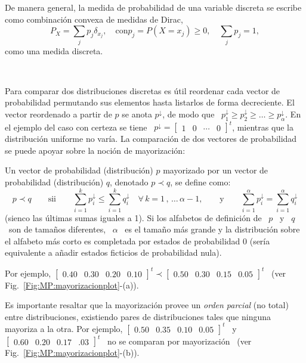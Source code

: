 De manera general, la medida de probabilidad de una variable discreta se escribe
como combinaci\'on convexa de medidas de Dirac,
%
\[
P_X =  \sum_j p_j  \delta_{x_j}, \quad  \mbox{con} p_j =  P(X=x_j) \ge  0, \quad
\sum_j p_j = 1,
\]
%
\noindent \ie como una medida discreta.

\

Para comparar  dos distribuciones discretas  es \'util reordenar cada  vector de
probabilidad permutando  sus elementos hasta listarlos de  forma decreciente. El
vector  reordenado a  partir  de $p$  se  anota $p^\downarrow$,  de  modo que  \
$p^\downarrow_1 \ge  p^\downarrow_2 \ge \ldots \ge  p^\downarrow_\alpha$.  En el
ejemplo del caso con certeza se tiene  \ $p^\downarrow = \begin{bmatrix} 1 & 0 &
  \cdots  &  0 \end{bmatrix}^t$,  mientras  que  la  distribuci\'on uniforme  no
var\'ia.  La comparaci\'on de dos vectores de probabilidad se puede apoyar sobre
la noci\'on de mayorizaci\'on:
%
\begin{definicion}[Mayorizaci\'on]
\label{Def:MP:Mayorizacion}
%
  Un vector  de probabilidad  (distribuci\'on) $p$ mayorizado  por un  vector de
  probabilidad (distribuci\'on) $q$, denotado $p \prec q$, se define como:
  \[
  p   \prec  q   \qquad  \mbox{sii}   \qquad  \sum_{i=1}^k   p_i^\downarrow  \le
  \sum_{i=1}^k q_i^\downarrow \quad \forall \, k = 1 \, , \, \ldots \, \alpha-1,
  \qquad  \mbox{y} \qquad  \sum_{i=1}^\alpha p_i^\downarrow  = \sum_{i=1}^\alpha
  q_i^\downarrow
  \]
  (sienco las \'ultimas sumas iguales a 1).  Si los alfabetos de definici\'on de
  \ $p$  \ y \ $q$  \ son de tama\~nos  diferentes, \ $\alpha$ \  es el tama\~no
  m\'as grande y  la distribuci\'on sobre el alfabeto  m\'as corto es completada
  por  estados  de  probabilidad  0  (ser\'ia  equivalente  a  a\~nadir  estados
  ficticios de probabilidad nula).
\end{definicion}
%
\noindent   Por    ejemplo,   $\begin{bmatrix}   0.40   &   0.30    &   0.20   &
  0.10   \end{bmatrix}^t  \prec   \begin{bmatrix}   0.50  &   0.30   &  0.15   &
  0.05 \end{bmatrix}^t$ \ (ver Fig.~\ref{Fig:MP:mayorizacionplot}-(a)).

Es importante resaltar  que la mayorizaci\'on provee un  {\em orden parcial} (no
total)  entre  distribuciones,  existiendo  pares de  distribuciones  tales  que
ninguna mayoriza a la otra.  Por  ejemplo, $\begin{bmatrix} 0.50 & 0.35 & 0.10 &
  0.05  \end{bmatrix}^t$  \   y  \  $\begin{bmatrix}  0.60  &   0.20  &  0.17  &
  .03   \end{bmatrix}^t$  \   no   se  comparan   por   mayorizaci\'on  \   (ver
Fig.~\ref{Fig:MP:mayorizacionplot}-(b)).

